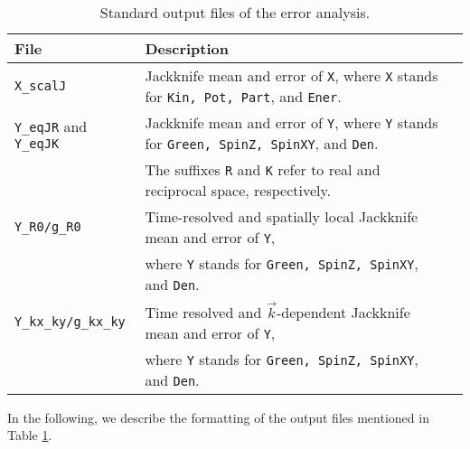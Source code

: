 %
\begin{table}[h]
   \begin{tabular}{@{} l l l @{}}\toprule
   File & Description \\\midrule
   \texttt{X\_scalJ} & Jackknife mean and error of \texttt{X}, where  \texttt{X} stands for \texttt{Kin, Pot, Part}, and \texttt{Ener}.\\
   \texttt{Y\_eqJR} and \texttt{Y\_eqJK} & Jackknife mean and error of \texttt{Y}, where \texttt{Y} stands for \texttt{Green, SpinZ, SpinXY}, and \texttt{Den}.\\
   & The suffixes \texttt{R} and \texttt{K} refer to real and reciprocal space, respectively.\\
   \texttt{Y\_R0/g\_R0} & Time-resolved and spatially local Jackknife mean and error of \texttt{Y},\\
   & where \texttt{Y} stands for \texttt{Green, SpinZ, SpinXY}, and \texttt{Den}.\\
   \texttt{Y\_kx\_ky/g\_kx\_ky} & Time resolved and $\vec{k}$-dependent Jackknife mean and error of \texttt{Y},\\
   & where \texttt{Y} stands for \texttt{Green, SpinZ, SpinXY}, and \texttt{Den}.\\\bottomrule
    \end{tabular}
   \caption{ Standard output files of the error analysis. \label{table:analysis_output}}
\end{table}
%
In the following, we describe the formatting of the output files mentioned in Table \ref{table:analysis_output}.
